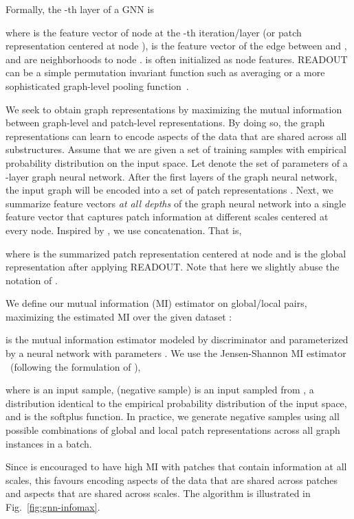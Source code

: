 \documentclass{article} \usepackage{iclr2020_conference,times}
\begin{document}
Formally, the -th layer of a GNN is 

where  is the feature vector of node  at the -th iteration/layer (or patch representation centered at node ),  is the feature vector of the edge between  and , and  are neighborhoods to node .  is often initialized as node features. READOUT can be a simple permutation invariant function such as averaging or a more sophisticated graph-level pooling function~\cite{ying2018hierarchical,zhang2018end}.



We seek to obtain graph representations by maximizing the mutual information between graph-level and patch-level representations. By doing so, the graph representations can learn to encode aspects of the data that are shared across all substructures. Assume that we are given a set of training samples  with empirical probability distribution  on the input space. 
Let  denote the set of parameters of a -layer graph neural network. After the first  layers of the graph neural network, the input graph will be encoded into a set of patch representations . Next, we summarize feature vectors \emph{at all depths} of the graph neural network into a single feature vector that captures patch information at different scales centered at every node. Inspired by \cite{xu2018representation}, we use concatenation. That is,

where  is the summarized patch representation centered at node  and  is the global representation after applying READOUT. Note that here we slightly abuse the notation of .


We define our mutual information (MI) estimator on global/local pairs, maximizing the estimated MI over the given dataset :




 is the mutual information estimator modeled by discriminator  and parameterized by a neural network with parameters .
We use the Jensen-Shannon MI estimator
~(following the formulation of \cite{nowozin2016f}),

where  is an input sample,  (negative sample) is an input sampled from , a distribution identical to the empirical probability distribution of the input space, and  is the softplus function. In practice, we generate negative samples using all possible combinations of global and local patch representations across all graph instances in a batch.

Since  is encouraged to have high MI with patches that contain information at all scales, this favours encoding aspects of the data that are shared across patches and aspects that are shared across scales. The algorithm is illustrated in Fig.~\ref{fig:gnn-infomax}. 
\end{document}
